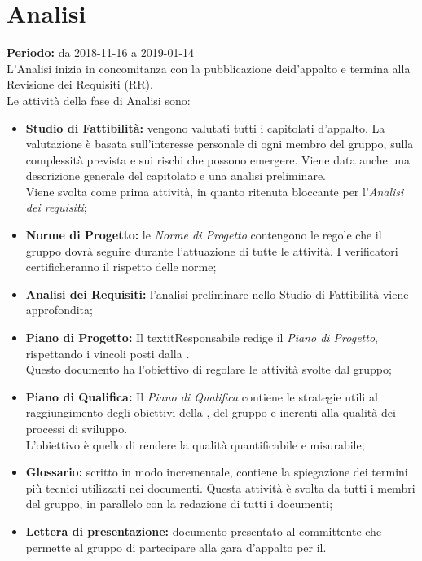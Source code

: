 \section{Analisi}
\textbf{Periodo:} da 2018-11-16 a 2019-01-14\\L'Analisi inizia in concomitanza con la pubblicazione deid’appalto e termina alla Revisione dei Requisiti (RR).\\
Le attività della fase di Analisi sono:
\begin{itemize}
    \item \textbf{Studio di Fattibilità:} vengono valutati tutti i capitolati d'appalto. La valutazione è basata sull'interesse personale di ogni membro del gruppo, sulla complessità prevista e sui rischi che possono emergere. Viene data anche una descrizione generale del capitolato e una analisi preliminare.\\Viene svolta come prima attività, in quanto ritenuta bloccante per l'\textit{Analisi dei requisiti};
    \item \textbf{Norme di Progetto:} le \textit{Norme di Progetto} contengono le regole che il gruppo dovrà seguire durante l'attuazione di tutte le attività. I verificatori certificheranno il rispetto delle norme;
    \item \textbf{Analisi dei Requisiti:} l'analisi preliminare nello Studio di Fattibilità viene approfondita;
    \item \textbf{Piano di Progetto:} Il textit{Responsabile} redige il \textit{Piano di Progetto}, rispettando i vincoli posti dalla .\\Questo documento ha l'obiettivo di regolare le attività svolte dal gruppo;
    \item \textbf{Piano di Qualifica:} Il \textit{Piano di Qualifica} contiene le strategie utili al raggiungimento degli obiettivi della , del gruppo e inerenti alla qualità dei processi di sviluppo.\\L'obiettivo è quello di rendere la qualità quantificabile e misurabile;
    \item \textbf{Glossario:} scritto in modo incrementale, contiene la spiegazione dei termini più tecnici utilizzati nei documenti. Questa attività è svolta da tutti i membri del gruppo, in parallelo con la redazione di tutti i documenti;
    \item \textbf{Lettera di presentazione:} documento presentato al committente che permette al gruppo di partecipare alla gara d’appalto per il.
\end{itemize}
